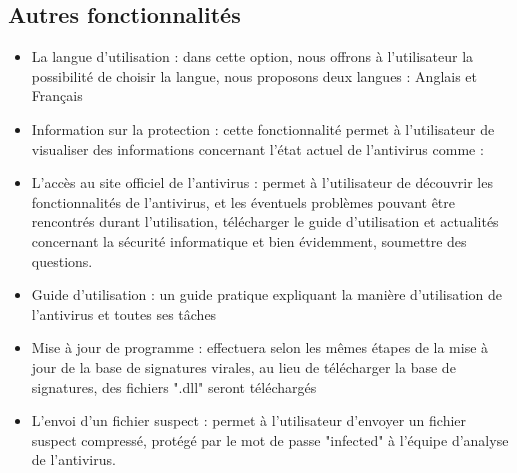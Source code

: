 \subsection{Autres fonctionnalités }
\begin{itemize}
 
\item La langue d'utilisation : dans cette option, nous offrons à l'utilisateur la possibilité de choisir la langue,  nous  proposons  deux langues : Anglais et Français 
\item Information sur la protection : cette fonctionnalité permet à l'utilisateur de visualiser  des informations concernant l'état actuel de l'antivirus comme :

\item L'accès au site officiel de l'antivirus : permet à l'utilisateur de découvrir les fonctionnalités de l'antivirus, et les éventuels problèmes pouvant être rencontrés durant l'utilisation, télécharger le guide d'utilisation et actualités concernant la sécurité informatique et bien évidemment, soumettre des questions.
\item Guide d'utilisation : un guide pratique expliquant la manière d'utilisation de l'antivirus et toutes ses tâches
\item Mise à jour de programme : effectuera selon les mêmes étapes de la mise à jour de la base de signatures virales, au lieu de télécharger la base de signatures, des fichiers ".dll" seront téléchargés
\item L'envoi d'un fichier suspect : permet à l'utilisateur d'envoyer un fichier suspect compressé, protégé par le mot de passe "infected" à l'équipe d'analyse de l'antivirus.
\end{itemize}
